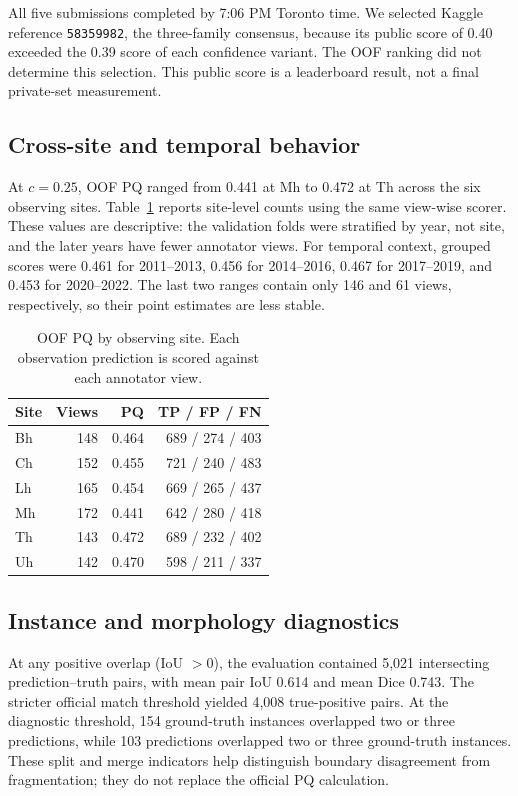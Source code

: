 \documentclass[sigconf]{acmart}
\begin{document}
All five submissions completed by 7:06 PM Toronto time. We selected Kaggle reference \texttt{58359982}, the three-family consensus, because its public score of 0.40 exceeded the 0.39 score of each confidence variant. The OOF ranking did not determine this selection. This public score is a leaderboard result, not a final private-set measurement.

\subsection{Cross-site and temporal behavior}
At $c=0.25$, OOF PQ ranged from 0.441 at Mh to 0.472 at Th across the six observing sites. Table~\ref{tab:site} reports site-level counts using the same view-wise scorer. These values are descriptive: the validation folds were stratified by year, not site, and the later years have fewer annotator views. For temporal context, grouped scores were 0.461 for 2011--2013, 0.456 for 2014--2016, 0.467 for 2017--2019, and 0.453 for 2020--2022. The last two ranges contain only 146 and 61 views, respectively, so their point estimates are less stable.

\begin{table}[t]
\centering
\caption{OOF PQ by observing site. Each observation prediction is scored against each annotator view.}
\label{tab:site}
\small
\begin{tabular}{lrrr}
\toprule
Site & Views & PQ & TP / FP / FN \\
\midrule
Bh & 148 & 0.464 & 689 / 274 / 403 \\
Ch & 152 & 0.455 & 721 / 240 / 483 \\
Lh & 165 & 0.454 & 669 / 265 / 437 \\
Mh & 172 & 0.441 & 642 / 280 / 418 \\
Th & 143 & 0.472 & 689 / 232 / 402 \\
Uh & 142 & 0.470 & 598 / 211 / 337 \\
\bottomrule
\end{tabular}
\end{table}

\subsection{Instance and morphology diagnostics}
At any positive overlap (IoU $>0$), the evaluation contained 5,021 intersecting prediction--truth pairs, with mean pair IoU 0.614 and mean Dice 0.743. The stricter official match threshold yielded 4,008 true-positive pairs. At the diagnostic threshold, 154 ground-truth instances overlapped two or three predictions, while 103 predictions overlapped two or three ground-truth instances. These split and merge indicators help distinguish boundary disagreement from fragmentation; they do not replace the official PQ calculation.
\end{document}
